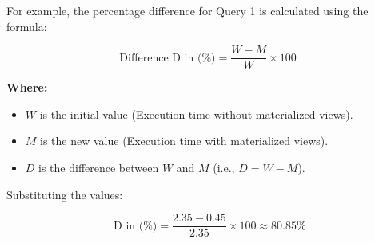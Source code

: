For example, the percentage difference for Query 1 is calculated using the formula:

\begin{equation}
\text{Difference D in  (\%)} = \frac{W - M}{W} \times 100
\end{equation}

\noindent \textbf{Where:}
\begin{itemize}
    \item \( W \) is the initial value (Execution time without materialized views).
    \item \( M \) is the new value (Execution time with materialized views).
    \item \( D \) is the difference between \( W \) and \( M \) (i.e., \( D = W - M \)).
\end{itemize}

Substituting the values:

\[
\text{ D in (\%)} = \frac{2.35 - 0.45}{2.35} \times 100 \approx 80.85\%
\]
